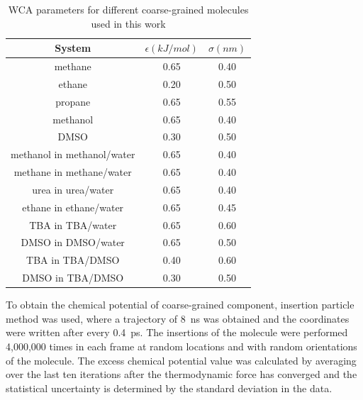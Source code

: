 \documentclass[a4paper,preprint,unsortedaddress]{revtex4-1}
\begin{document}
\begin{table}[]
\begin{center}
\begin{tabular}{ccc}
\hline \hline
 System & $\epsilon (kJ/mol)$ & $\sigma (nm)$ \\
\hline
methane & 0.65 & 0.40 \\
ethane & 0.20 & 0.50 \\
propane & 0.65 & 0.55 \\
methanol & 0.65 & 0.40 \\
DMSO & 0.30 & 0.50 \\
methanol in methanol/water & 0.65 & 0.40 \\
methane in methane/water & 0.65 & 0.40 \\
urea in urea/water & 0.65 & 0.40 \\
ethane in ethane/water & 0.65 & 0.45 \\
TBA in TBA/water & 0.65 & 0.60\\
DMSO in DMSO/water & 0.65 & 0.50 \\
TBA in TBA/DMSO & 0.40 & 0.60 \\
DMSO in TBA/DMSO & 0.30 & 0.50 \\
\hline \hline
\end{tabular}
\caption{WCA parameters for different coarse-grained molecules used in this work}
\label{cg}
\end{center}
\end{table}



To obtain the chemical potential of coarse-grained component, 
insertion particle method was used, where a trajectory of 8~ns was obtained and the coordinates were written
after every 0.4~ps. The insertions of the molecule were performed 4,000,000 times in each 
frame at random locations and with random orientations of the molecule.  
{The excess chemical potential value was calculated by averaging over the last ten iterations after 
the thermodynamic force has converged and the statistical uncertainty is determined by the standard deviation in the data. \\}
\end{document}
